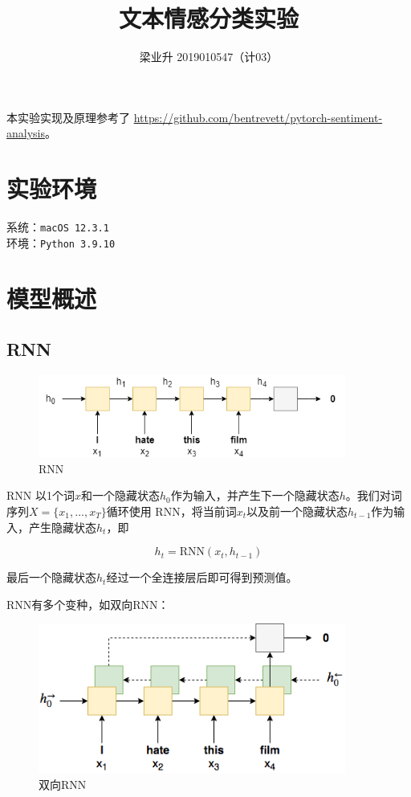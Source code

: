 \documentclass[a4paper]{article}
\begin{document}
\title{文本情感分类实验}
\author{梁业升 2019010547（计03）}

\maketitle

本实验实现及原理参考了 \url{https://github.com/bentrevett/pytorch-sentiment-analysis}。

\section*{实验环境}

系统：\texttt{macOS 12.3.1}\\
环境：\texttt{Python 3.9.10}

\section{模型概述}

\subsection{RNN}

\begin{figure}[H]
    \centering
    \includegraphics[width=0.9\textwidth]{assets/rnn.png}
    \caption{RNN}
\end{figure}

RNN 以1个词$x$和一个隐藏状态$h_0$作为输入，并产生下一个隐藏状态$h$。我们对词序列$X=\{x_1,\ldots,x_T\}$循环使用 RNN，将当前词$x_t$以及前一个隐藏状态$h_{t-1}$作为输入，产生隐藏状态$h_t$，即

\begin{equation}
    h_t=\textrm{RNN}(x_t,h_{t-1})
\end{equation}

最后一个隐藏状态$h_t$经过一个全连接层后即可得到预测值。

RNN有多个变种，如双向RNN：

\begin{figure}[H]
    \centering
    \includegraphics[width=0.9\textwidth]{assets/bi-rnn.png}
    \caption{双向RNN}
\end{figure}
\end{document}
